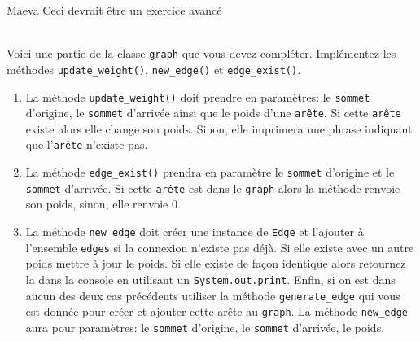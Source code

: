\begin{note}{Maeva}
    Ceci devrait être un exercice avancé
\end{note}
\begin{Exercice}[20 minutes]\\

Voici une partie de la classe \lstinline{graph} que vous devez compléter. Implémentez les méthodes \lstinline{update_weight()}, \lstinline{new_edge()} et \lstinline{edge_exist()}.

         
    \begin{enumerate}
        \item La méthode \lstinline{update_weight()} doit prendre en paramètres: le \lstinline{sommet} d'origine, le \lstinline{sommet} d'arrivée ainsi que le poids d'une \lstinline{arête}. Si cette \lstinline{arête} existe alors elle change son poids. Sinon, elle imprimera une phrase indiquant que l'\lstinline{arête} n'existe pas.
        \item La méthode \lstinline{edge_exist()} prendra en paramètre le \lstinline{sommet} d'origine et le \lstinline{sommet} d'arrivée. Si cette \lstinline{arête} est dans le \lstinline{graph} alors la méthode renvoie son poids, sinon, elle renvoie 0.
        \item La méthode \lstinline{new_edge} doit créer une instance de \lstinline{Edge} et l'ajouter à l'ensemble \lstinline{edges} si la connexion n'existe pas déjà. Si elle existe avec un autre poids mettre à jour le poids. Si elle existe de façon identique alors retournez la dans la console en utilisant un \lstinline{System.out.print}. Enfin, si on est dans aucun des deux cas précédents utiliser la méthode \lstinline{generate_edge} qui vous est donnée pour créer et ajouter cette arête au \lstinline{graph}. La méthode \lstinline{new_edge} aura pour paramètres: le \lstinline{sommet} d'origine, le \lstinline{sommet} d'arrivée, le poids.
    \end{enumerate}


\end{Exercice}

